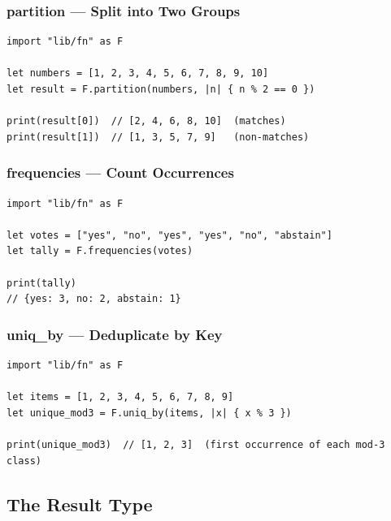\subsubsection{partition --- Split into Two Groups}

\begin{lstlisting}[language=Lattice, caption={Partitioning an array}]
import "lib/fn" as F

let numbers = [1, 2, 3, 4, 5, 6, 7, 8, 9, 10]
let result = F.partition(numbers, |n| { n % 2 == 0 })

print(result[0])  // [2, 4, 6, 8, 10]  (matches)
print(result[1])  // [1, 3, 5, 7, 9]   (non-matches)
\end{lstlisting}

\subsubsection{frequencies --- Count Occurrences}

\begin{lstlisting}[language=Lattice, caption={Counting element frequencies}]
import "lib/fn" as F

let votes = ["yes", "no", "yes", "yes", "no", "abstain"]
let tally = F.frequencies(votes)

print(tally)
// {yes: 3, no: 2, abstain: 1}
\end{lstlisting}

\subsubsection{uniq\_by --- Deduplicate by Key}

\begin{lstlisting}[language=Lattice, caption={Deduplication by a key function}]
import "lib/fn" as F

let items = [1, 2, 3, 4, 5, 6, 7, 8, 9]
let unique_mod3 = F.uniq_by(items, |x| { x % 3 })

print(unique_mod3)  // [1, 2, 3]  (first occurrence of each mod-3 class)
\end{lstlisting}

\subsection{The Result Type}\label{subsec:fn-result}

